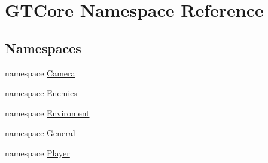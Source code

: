 \hypertarget{namespace_g_t_core}{}\section{G\+T\+Core Namespace Reference}
\label{namespace_g_t_core}
\subsection*{Namespaces}
\begin{DoxyCompactItemize}
\item 
namespace \hyperlink{namespace_g_t_core_1_1_camera}{Camera}
\item 
namespace \hyperlink{namespace_g_t_core_1_1_enemies}{Enemies}
\item 
namespace \hyperlink{namespace_g_t_core_1_1_enviroment}{Enviroment}
\item 
namespace \hyperlink{namespace_g_t_core_1_1_general}{General}
\item 
namespace \hyperlink{namespace_g_t_core_1_1_player}{Player}
\end{DoxyCompactItemize}
